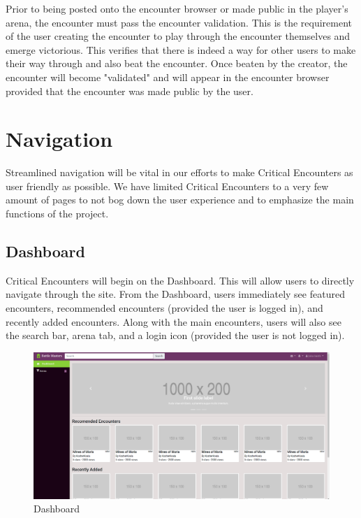 \documentclass[12pt,a4paper]{report}
\begin{document}
		Prior to being posted onto the encounter browser or made public in the player's arena, the encounter must pass the encounter validation. This is the requirement of the user creating the encounter to play through the encounter themselves and emerge victorious. This verifies that there is indeed a way for other users to make their way through and also beat the encounter. Once beaten by the creator, the encounter will become "validated" and will appear in the encounter browser provided that the encounter was made public by the user.
	\newpage	
	\section{Navigation}
	Streamlined navigation will be vital in our efforts to make Critical Encounters as user friendly as possible. We have limited Critical Encounters to a very few amount of pages to not bog down the user experience and to emphasize the main functions of the project.
		\subsection{Dashboard}
		Critical Encounters will begin on the Dashboard. This will allow users to directly navigate through the site. From the Dashboard, users immediately see featured encounters, recommended encounters (provided the user is logged in), and recently added encounters. Along with the main encounters, users will also see the search bar, arena tab, and a login icon (provided the user is not logged in).
		\begin{figure}[H]
			\centering
			\centerline{\includegraphics[scale=.2]{home}}
			\caption{Dashboard}
			\label{fig: Dashboard}
		\end{figure}
		\newpage
\end{document}
